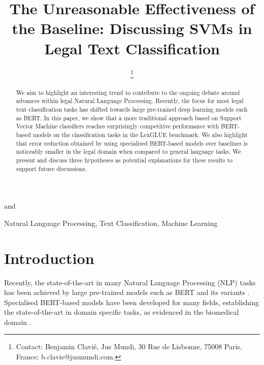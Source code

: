 \documentclass{IOS-Book-Article}
\begin{document}
\pagestyle{headings}
\def\thepage{}

\begin{frontmatter} 


\title{The Unreasonable Effectiveness of the Baseline: Discussing SVMs in Legal Text Classification}



\author[A]{ \thanks{Contact: Benjamin Clavié, Jus Mundi, 30 Rue de Lisbonne,
75008 Paris, France;
b.clavie@jusmundi.com.}}
and
\author[A]{ }



\address[A]{Jus Mundi}


\begin{abstract}
We aim to highlight an interesting trend to contribute to the ongoing debate around advances within legal Natural Language Processing. Recently, the focus for most legal text classification tasks has shifted towards large pre-trained deep learning models such as BERT. In this paper, we show that a more traditional approach based on Support Vector Machine classifiers reaches surprisingly competitive performance with BERT-based models on the classification tasks in the LexGLUE benchmark. We also highlight that error reduction obtained by using specialised BERT-based models over baselines is noticeably smaller in the legal domain when compared to general language tasks. We present and discuss three hypotheses as potential explanations for these results to support future discussions.
\end{abstract}

\begin{keyword}
Natural Language Processing\sep 
Text Classification\sep
Machine Learning
\end{keyword}
\end{frontmatter}


\section{Introduction}
Recently, the state-of-the-art in many Natural Language Processing (NLP) tasks has been achieved by large pre-trained models such as BERT and its variants \cite{bert}. Specialised BERT-based models have been developed for many fields, establishing the state-of-the-art in domain specific tasks, as evidenced in the biomedical domain \cite{biobert}.
\end{document}
